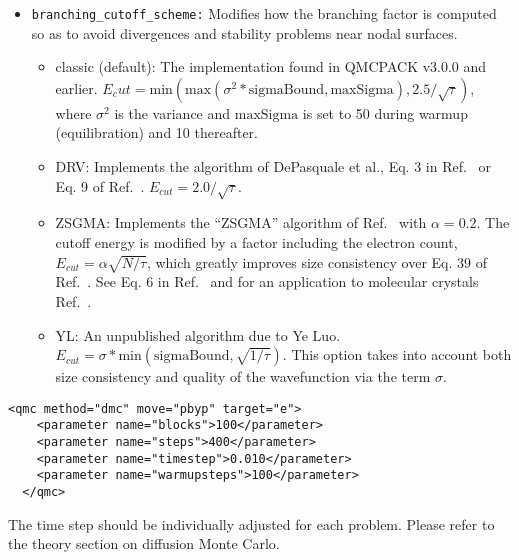 \begin{itemize}


\item \texttt{branching\_cutoff\_scheme:} Modifies how the branching factor is computed so as to avoid divergences and stability
problems near nodal surfaces. 
\begin{itemize}
  \item classic (default): The implementation found in QMCPACK v3.0.0 and earlier.
  $E_cut=\mathrm{min}(\mathrm{max}(\sigma^2 * \mathrm{sigmaBound},\mathrm{maxSigma}),2.5/\sqrt{\tau})$,
  where $\sigma^2$ is the variance and $\mathrm{maxSigma}$ is set to 50 during warmup (equilibration) and 10 thereafter.
  \item DRV: Implements the algorithm of DePasquale et al., Eq. 3 in Ref.~\cite{DePasqualeReliable1988} or Eq. 9 of Ref.~\cite{Umrigar1993}.
  $E_{cut}=2.0/\sqrt{\tau}$.
  \item ZSGMA: Implements the ``ZSGMA'' algorithm of Ref.~\cite{ZenBoosting2016} with $\alpha=0.2$. The cutoff energy is modified by a factor including the
  electron count, $E_{cut}=\alpha \sqrt{N/\tau}$, which greatly improves size consistency over Eq. 39 of Ref.~\cite{Umrigar1993}. See Eq. 6 in Ref.~\cite{ZenBoosting2016} and for
  an application to molecular crystals Ref.~\cite{ZenFast2018}.
  \item YL: An unpublished algorithm due to Ye Luo. $E_{cut}=\sigma*\mathrm{min}(\mathrm{sigmaBound},\sqrt{1/\tau})$. This option takes into account both size consistency and quality of the wavefunction via the term $\sigma$.
\end{itemize}

\end{itemize}

\begin{lstlisting}[style=QMCPXML,caption=The following is an example of a very simple DMC section. ]
  <qmc method="dmc" move="pbyp" target="e">
    <parameter name="blocks">100</parameter>
    <parameter name="steps">400</parameter>
    <parameter name="timestep">0.010</parameter>
    <parameter name="warmupsteps">100</parameter>
  </qmc>
\end{lstlisting}
The time step should be individually adjusted for each problem.  Please refer to the theory section
on diffusion Monte Carlo.


